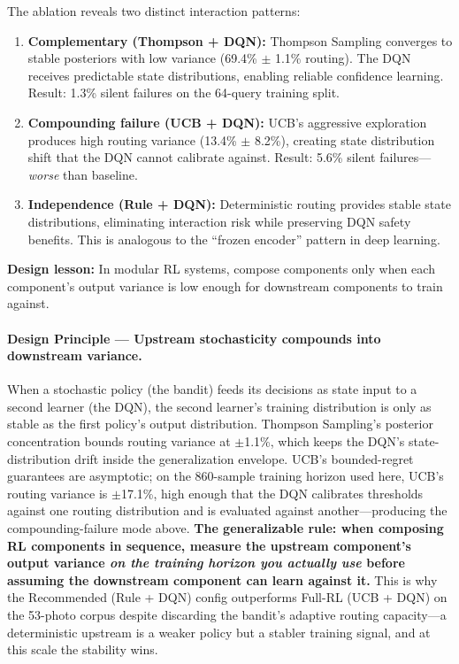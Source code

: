 \documentclass[11pt,letterpaper]{article}
\begin{document}
The ablation reveals two distinct interaction patterns:

\begin{enumerate}
  \item \textbf{Complementary (Thompson + DQN):} Thompson Sampling converges to stable posteriors with low variance (69.4\% $\pm$ 1.1\% routing). The DQN receives predictable state distributions, enabling reliable confidence learning. Result: 1.3\% silent failures on the 64-query training split.

  \item \textbf{Compounding failure (UCB + DQN):} UCB's aggressive exploration produces high routing variance (13.4\% $\pm$ 8.2\%), creating state distribution shift that the DQN cannot calibrate against. Result: 5.6\% silent failures---\textit{worse} than baseline.

  \item \textbf{Independence (Rule + DQN):} Deterministic routing provides stable state distributions, eliminating interaction risk while preserving DQN safety benefits. This is analogous to the ``frozen encoder'' pattern in deep learning.
\end{enumerate}

\textbf{Design lesson:} In modular RL systems, compose components only when each component's output variance is low enough for downstream components to train against.

\paragraph{Design Principle --- Upstream stochasticity compounds into downstream variance.} When a stochastic policy (the bandit) feeds its decisions as state input to a second learner (the DQN), the second learner's training distribution is only as stable as the first policy's output distribution. Thompson Sampling's posterior concentration bounds routing variance at $\pm$1.1\%, which keeps the DQN's state-distribution drift inside the generalization envelope. UCB's bounded-regret guarantees are asymptotic; on the 860-sample training horizon used here, UCB's routing variance is $\pm$17.1\%, high enough that the DQN calibrates thresholds against one routing distribution and is evaluated against another---producing the compounding-failure mode above. \textbf{The generalizable rule: when composing RL components in sequence, measure the upstream component's output variance \emph{on the training horizon you actually use} before assuming the downstream component can learn against it.} This is why the Recommended (Rule + DQN) config outperforms Full-RL (UCB + DQN) on the 53-photo corpus despite discarding the bandit's adaptive routing capacity---a deterministic upstream is a weaker policy but a stabler training signal, and at this scale the stability wins.
\end{document}
